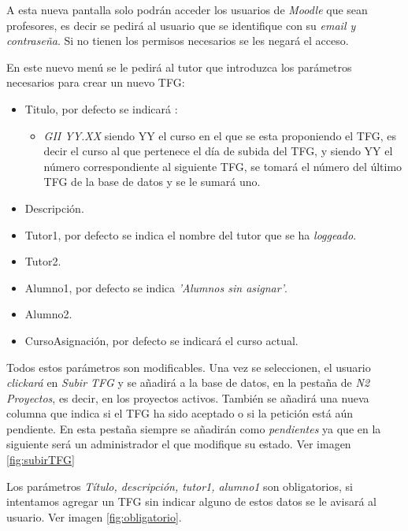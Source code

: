 A esta nueva pantalla solo podrán acceder los usuarios de \emph{Moodle} que sean profesores, es decir se pedirá al usuario que se identifique con su \emph{email y contraseña}. Si no tienen los permisos necesarios se les negará el acceso.

En este nuevo menú se le pedirá al tutor que introduzca los parámetros necesarios para crear un nuevo TFG:

\begin{itemize}
	\item Titulo, por defecto se indicará :
	\begin{itemize}
		\item \emph{GII YY.XX} siendo YY el curso en el que se esta proponiendo el TFG, es decir el curso al que pertenece el día de subida del TFG, y siendo YY el número correspondiente al siguiente TFG, se tomará el número del último TFG de la base de datos y se le sumará uno.
	\end{itemize}
	\item Descripción.
	\item Tutor1, por defecto se indica el nombre del tutor que se ha \emph{loggeado}.
	\item Tutor2.
	\item Alumno1, por defecto se indica \emph{'Alumnos sin asignar'}.
	\item Alumno2.
	\item CursoAsignación, por defecto se indicará el curso actual.
\end{itemize}

Todos estos parámetros son modificables. Una vez se seleccionen, el usuario \emph{clickará} en \emph{Subir TFG} y se añadirá a la base de datos, en la pestaña de \emph{N2 Proyectos}, es decir, en los proyectos activos.
También se añadirá una nueva columna que indica si el TFG ha sido aceptado o si la petición está aún pendiente. En esta pestaña siempre se añadirán como \emph{pendientes} ya que en la siguiente será un administrador el que modifique su estado. Ver imagen \ref{fig:subirTFG}


Los parámetros \emph{Título, descripción, tutor1, alumno1} son obligatorios, si intentamos agregar un TFG sin indicar alguno de estos datos se le avisará al usuario. Ver imagen \ref{fig:obligatorio}.


